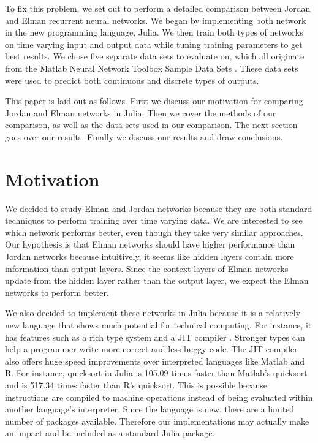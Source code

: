 \documentclass{acm_proc_article-sp}
\begin{document}
To fix this problem, we set out to perform a detailed comparison between Jordan and Elman recurrent neural networks. 
We began by implementing both network in the new programming language, Julia. 
We then train both types of networks on time varying input and output data while tuning training parameters to get best results. 
We chose five separate data sets to evaluate on, which all originate from the Matlab Neural Network Toolbox Sample Data Sets \cite{data}. 
These data sets were used to predict both continuous and discrete types of outputs.

This paper is laid out as follows. First we discuss our motivation for comparing Jordan and Elman networks in Julia. %
Then we cover the methods of our comparison, as well as the data sets used in our comparison. The next section goes over our results. Finally we discuss our results and draw conclusions.

\section{Motivation}
We decided to study Elman and Jordan networks because they are both standard techniques to perform training over time varying data. 
We are interested to see which network performs better, even though they take very similar approaches. 
Our hypothesis is that Elman networks should have higher performance than Jordan networks because intuitively, it seems like hidden layers contain more information than output layers. Since the context layers of Elman networks update from the hidden layer rather than the output layer, we expect the Elman networks to perform better. 

We also decided to implement these networks in Julia because it is a relatively new language that shows much potential for technical computing. 
For instance, it has features such as a rich type system and a JIT compiler \cite{julia}. 
Stronger types can help a programmer write more correct and less buggy code. 
The JIT compiler also offers huge speed improvements over interpreted languages like Matlab and R. 
For instance, quicksort in Julia is 105.09 times faster than Matlab's quicksort and is 517.34 times faster than R's quicksort. 
This is possible because instructions are compiled to machine operations instead of being evaluated within another language's interpreter.
Since the language is new, there are a limited number of packages available. Therefore our implementations may actually make an impact and be included as a standard Julia package. 
\end{document}
